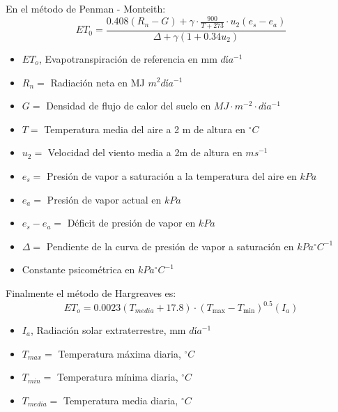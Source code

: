 En el método de Penman - Monteith:
\begin{equation}
    ET_0 = \frac{0.408\left(R_n - G\right) +\gamma\cdot \frac{900}{T+273}\cdot u_2\left(e_s -e_a\right)}{\Delta +\gamma\left(1 + 0.34u_2\right)}
\end{equation}
\begin{notation}
    \begin{itemize}
        \item $ET_o$, Evapotranspiración de referencia en mm $día^{-1}$
        \item $R_n=$ Radiación neta en MJ $m^2día^{-1}$
        \item $G=$ Densidad de flujo de calor del suelo en $MJ\cdot m^{-2}\cdot día^{-1}$
        \item $T=$ Temperatura media del aire a 2 m de altura en $^{\circ}C$
        \item $u_2=$ Velocidad del viento media a 2m de altura en $ms^{-1}$
        \item $e_s=$ Presión de vapor a saturación a la temperatura del aire en $kPa$
        \item $e_a=$ Presión de vapor actual en $kPa$
        \item $e_s-e_a=$ Déficit de presión de vapor en $kPa$
        \item $\Delta=$ Pendiente de la curva de presión de vapor a saturación en $kPa^{\circ}C^{-1}$
        \item Constante psicométrica en $kPa^{\circ}C^{-1}$
        \end{itemize}
\end{notation}

Finalmente el método de Hargreaves es:
\begin{equation}
    ET_o = 0.0023\left(T_{media} + 17.8\right)\cdot\left(T_{\max} - T_{\min}\right)^{0.5}(I_a)
\end{equation}
\begin{notation}
    \begin{itemize}
        \item $I_a$, Radiación solar extraterrestre, mm $día^{-1}$
        \item $T_{max}=$ Temperatura máxima diaria, $^{\circ}C$
        \item $T_{min}=$ Temperatura mínima diaria, $^{\circ}C$	
        \item $T_{media}=$ Temperatura media diaria, $^{\circ}C$
        \end{itemize}
\end{notation}
